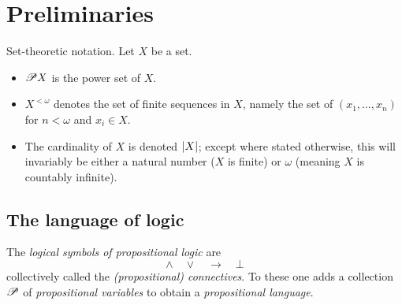 \chapter{Preliminaries}

Set-theoretic notation. Let \( X \) be a set.
\begin{itemize}
	\item \( \mathscr{P} X \) is the power set of \( X \).
	\item \( X^{<ω} \) denotes the set of finite sequences in \( X \), namely the set of \( ( x_1 , …, x_n ) \) for \( n < ω \) and \( x_i ∈ X \).
	\item The cardinality of \( X \) is denoted \( \lvert{X}\rvert \); except where stated otherwise, this will invariably be either a natural number (\( X \) is finite) or \( ω \) (meaning \( X \) is countably infinite).
\end{itemize}



\section{The language of logic}

The \emph{logical symbols of propositional logic} are
\[ 
	∧ \quad  ∨ \quad  → \quad ⊥ 
\]
collectively called the \emph{(propositional) connectives}.
To these one adds a collection \( \mathscr{P} \) of \emph{propositional variables} to obtain a \emph{propositional language}.

